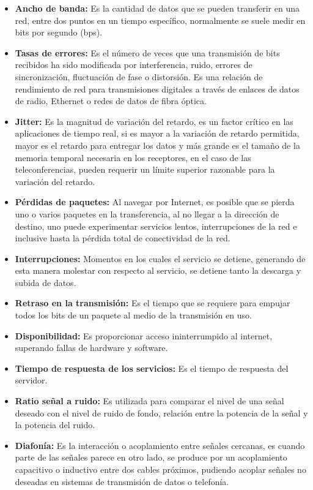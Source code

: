 \documentclass[a4paper,12pt]{article}
\begin{document}
\begin{itemize}
    \item \textbf{Ancho de banda: }Es la cantidad de datos que se pueden transferir en una red, entre dos puntos en un tiempo específico, normalmente se suele medir en bits por segundo (bps).
    \item \textbf{Tasas de errores: }Es el número de veces que una transmisión de bits recibidos ha sido modificada por interferencia, ruido, errores de sincronización, fluctuación de fase o distorsión. Es una relación de rendimiento de red para transmisiones digitales a través de enlaces de datos de radio, Ethernet o redes de datos de fibra óptica.
    \item \textbf{Jitter: } Es la magnitud de variación del retardo, es un factor crítico en las aplicaciones de tiempo real, si es mayor a la variación de retardo permitida, mayor es el retardo para entregar los datos y más grande es el tamaño de la memoria temporal necesaria en los receptores, en el caso de las teleconferencias, pueden requerir un límite superior razonable para la variación del retardo.
    \item \textbf{Pérdidas de paquetes: }Al navegar por Internet, es posible que se pierda uno o varios paquetes en la transferencia, al no llegar a la dirección de destino, uno puede experimentar servicios lentos, interrupciones de la red e inclusive hasta la pérdida total de conectividad de la red.
    \item \textbf{Interrupciones: }Momentos en los cuales el servicio se detiene, generando de esta manera molestar con respecto al servicio, se detiene tanto la descarga y subida de datos.
    \item \textbf{Retraso en la transmisión: }Es el tiempo que se requiere para empujar todos los bits de un paquete al medio de la transmisión en uso.
    \item \textbf{Disponibilidad: }Es proporcionar acceso ininterrumpido al internet, superando fallas de hardware y software.
    \item \textbf{Tiempo de respuesta de los servicios: } Es el tiempo de respuesta del servidor.
    \item \textbf{Ratio señal a ruido: }Es utilizada para comparar el nivel de una señal deseado con el nivel de ruido de fondo, relación entre la potencia de la señal y la potencia del ruido.
    \item \textbf{Diafonía: }Es la interacción o acoplamiento entre señales cercanas, es cuando parte de las señales parece en otro lado, se produce por un acoplamiento capacitivo o inductivo entre dos cables próximos, pudiendo acoplar señales no deseadas en sistemas de transmisión de datos o telefonía.

\end{itemize}
\end{document}
